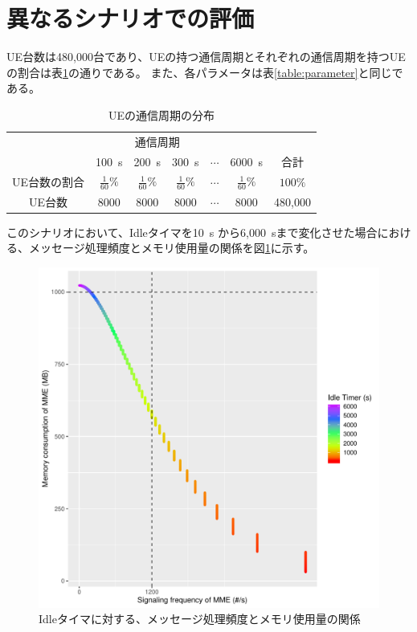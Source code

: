 \documentclass[a4j]{ujarticle}
\begin{document}
\section{異なるシナリオでの評価}
UE台数は480,000台であり、UEの持つ通信周期とそれぞれの通信周期を持つUEの割合は表\ref{table:scenario6}の通りである。
また、各パラメータは表\ref{table:parameter}と同じである。
\begin{table}[htbp]
  \centering
  \caption{UEの通信周期の分布}
  \label{table:scenario6}
  \begin{tabular}{c|ccccc|c}
    \hline
    &\multicolumn{4}{c}{通信周期}& \\
    & 100~s & 200~s & 300~s & $\cdots$ & 6000~s & 合計\\\hline \hline
    UE台数の割合 & $\frac{1}{60}\%$ & $\frac{1}{60}\%$ & $\frac{1}{60}\%$ & $\cdots$ &$\frac{1}{60}\%$ & $100\%$ \\
    UE台数 & 8000 & 8000 & 8000 & $\cdots$ & 8000 & 480,000 \\\hline
  \end{tabular}
\end{table}
このシナリオにおいて、Idleタイマを10~s から6,000~sまで変化させた場合における、メッセージ処理頻度とメモリ使用量の関係を図\ref{18_signaling_vs_memoryload_all}に示す。
\begin{figure}[htbp]
  \centering
  \includegraphics[width=0.8\hsize]{18_signaling_vs_memoryload_all.pdf}
  \caption{Idleタイマに対する、メッセージ処理頻度とメモリ使用量の関係}
  \label{18_signaling_vs_memoryload_all}
\end{figure}
\end{document}

